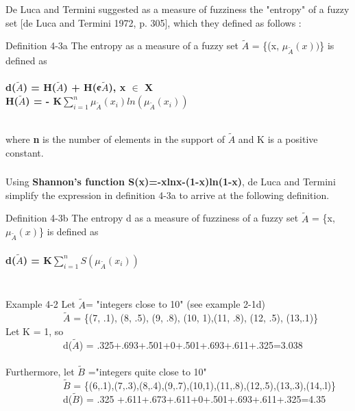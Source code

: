 \documentclass{beamer}
\begin{document}
\begin{CJK*}{UTF8}{bsmi}
\begin{frame}
\frametitle{}
De Luca and Termini suggested as a measure of fuzziness the {\color{red}"entropy"} of a fuzzy set [de Luca and Termini 1972, p. 305], which they defined as follows :\\
\begin{block}{Definition 4-3a}
The entropy as a measure of a fuzzy set $\tilde{A}$ = \{(x, $\mu_{\tilde{A}}(x))$\} is defined as\\
~\\
\centering\textbf{d($\tilde{A}$) = H($\tilde{A}$) + H(¢$\tilde{A}$), x $\in$ X}\\
\centering\textbf{H($\tilde{A}$) = - K$\sum_{i=1}^n \mu_{\tilde{A}}(x_{i})ln(\mu_{\tilde{A}}(x_{i}))$}\\
~\\
\end{block}
where \textbf{n} is the number of elements in the support of $\tilde{A}$ and K is a positive constant.
\end{frame}


\begin{frame}
\frametitle{}
Using \textbf{Shannon's function S(x)=-xlnx-(1-x)ln(1-x)}, de Luca and Termini simplify the expression in definition 4-3a to arrive at the following definition.\\
\begin{block}{Definition 4-3b}
The entropy d as a measure of fuzziness of a fuzzy set $\tilde{A}$ = \{x, $\mu_{\tilde{A}}(x)$\} is defined as\\
~\\
\centering\textbf{d($\tilde{A}$) = K$\sum_{i=1}^n S(\mu_{\tilde{A}}(x_{i}))$}\\
~\\
\end{block}
\end{frame}


\begin{frame}
\frametitle{}
\begin{block}{Example 4-2}
Let $\tilde{A}$= "integers close to 10" (see example 2-1d)\\
~~~~~~~~~~~~$\tilde{A}$ = \{(7, .1), (8, .5), (9, .8), (10, 1),(11, .8), (12, .5), (13,.1)\}\\
Let K = 1, so\\
~~~~~~~~~~~~d($\tilde{A}$) = .325+.693+.501+0+.501+.693+.611+.325=3.038\\
~\\
Furthermore, let $\tilde{B}$ ="integers quite close to 10"\\
~~~~~~~~~~~~$\tilde{B}$ = \{(6,.1),(7,.3),(8,.4),(9,.7),(10,1),(11,.8),(12,.5),(13,.3),(14,.l)\}\\
~~~~~~~~~~~~d($\tilde{B}$) = .325 +.611+.673+.611+0+.501+.693+.611+.325=4.35
\end{block}


\end{frame}
\end{CJK*}
\end{document}
